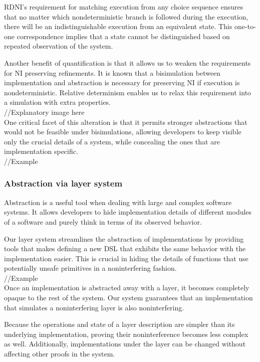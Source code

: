 \documentclass[onecolumn]{paper}
\begin{document}
RDNI's requirement for matching execution from any choice sequence ensures that no matter which nondeterministic branch is followed during the execution, there will be an indistinguishable execution from an equivalent state. This one-to-one correspondence implies that a state cannot be distinguished based on repeated observation of the system.

Another benefit of quantification is that it allows us to weaken the requirements for NI preserving refinements. It is known that a bisimulation between implementation and abstraction is necessary for preserving NI if execution is nondeterministic. Relative determinism enables us to relax this requirement into a simulation with extra properties. \\

//Explanatory image here\\

One critical facet of this alteration is that it permits stronger abstractions that would not be feasible under bisimulations, allowing developers to keep visible only the crucial details of a system, while concealing the ones that are implementation specific.\\

//Example

\subsubsection*{Abstraction via layer system}
Abstraction is a useful tool when dealing with large and complex software systems.
It allows developers to hide implementation details of different modules of a software and purely think in terms of its observed behavior.

Our layer system streamlines the abstraction of implementations by providing tools that makes defining a new DSL that exhibits the same behavior with the implementation easier.
This is crucial in hiding the details of functions that use potentially unsafe primitives in a noninterfering fashion.\\

//Example\\

Once an implementation is abstracted away with a layer, it becomes completely opaque to the rest of the system. Our system guarantees that an implementation that simulates a noninterfering layer is also noninterfering.

Because the operations and state of a layer description are simpler than its underlying implementation, proving their noninterference becomes less complex as well. Additionally, implementations under the layer can be changed without affecting other proofs in the system.
\end{document}
